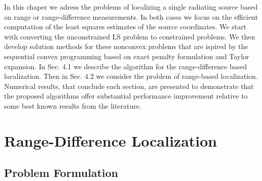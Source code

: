 \label{chapter:scp}

%
%
%
%



In this chaper we adress the problems of localizing a single radiating source based on range or range-difference measurements. In both cases we focus on the efficient computation of the least squares estimates of the source coordinates. We start with converting the unconstrained LS problem to  constrained problems. We then develop solution methods for these nonconvex problems that are ispired by the sequential convex programming based on exact penalty formulation and Taylor expansion. In Sec. 4.1 we describe the  algorithm for the range-difference based localization. Then in Sec. 4.2 we consider the problem of range-based localization. Numerical results, that conclude each section, are presented to demonstrate that the proposed algorithms offer substantial performance improvement relative to some best known results from the literature.





\section{Range-Difference Localization}
\subsection{Problem Formulation}


